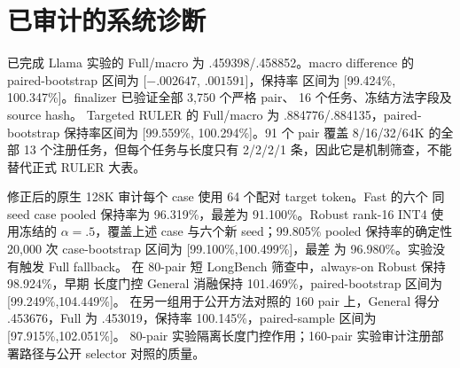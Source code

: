 \section{已审计的系统诊断}
\label{app:system-diagnostics}

\begin{table}[!htbp]
\caption{冻结路径的执行状态。只有完成且通过严格配对验证的行才能进入最终
结果表。}
\label{tab:audited-progress}
\centering
{}
\end{table}

已完成 Llama 实验的 Full/\method macro 为 .459398/.458852。macro
difference 的 paired-bootstrap 区间为 [$-.002647$, $.001591$]，保持率
区间为 [99.424\%, 100.347\%]。finalizer 已验证全部 3,750 个严格 pair、
16 个任务、冻结方法字段及 source hash。
Targeted RULER 的 Full/\method macro 为 .884776/.884135，paired-bootstrap
保持率区间为 [99.559\%, 100.294\%]。91 个 pair 覆盖 8/16/32/64K 的全部
13 个注册任务，但每个任务与长度只有 2/2/2/1 条，因此它是机制筛查，不能
替代正式 RULER 大表。

修正后的原生 128K 审计每个 case 使用 64 个配对 target token。Fast 的六个
同 seed case pooled 保持率为 96.319\%，最差为 91.100\%。Robust rank-16
INT4 使用冻结的 $\alpha=.5$，覆盖上述 case 与六个新 seed；99.805\% pooled
保持率的确定性 20,000 次 case-bootstrap 区间为 [99.100\%,100.499\%]，最差
为 96.980\%。实验没有触发 Full fallback。
在 80-pair 短 LongBench 筛查中，always-on Robust 保持 98.924\%，早期
长度门控 General 消融保持 101.469\%，paired-bootstrap 区间为
[99.249\%,104.449\%]。
在另一组用于公开方法对照的 160 pair 上，General 得分 .453676，Full 为
.453019，保持率 100.145\%，paired-sample 区间为 [97.915\%,102.051\%]。
80-pair 实验隔离长度门控作用；160-pair 实验审计注册部署路径与公开 selector
对照的质量。

